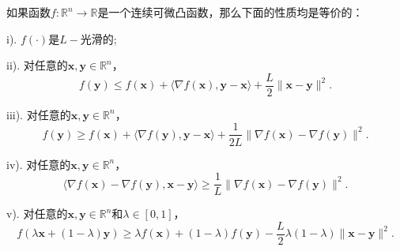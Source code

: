 \begin{theorem}[$L-$光滑的多种刻画性质]
    如果函数$f: \mathbb{R}^{n} \rightarrow \mathbb{R}$是一个连续可微凸函数，那么下面的性质均是等价的：
\par     i). $f(\cdot)$是$L -$光滑的; 
\par    ii). 对任意的$\bm{x}, \bm{y} \in \mathbb{R}^{n}$，
    \begin{equation}
        f(\bm{y}) \leq f(\bm{x})+\langle\nabla f(\bm{x}), \bm{y}-\bm{x}\rangle+\frac{L}{2}\|\bm{x}-\bm{y}\|^{2} .
        \nonumber
    \end{equation} 
\par    iii). 对任意的$\bm{x}, \bm{y} \in \mathbb{R}^{n}$，
    \begin{equation}
        f(\bm{y}) \geq f(\bm{x})+\langle\nabla f(\bm{y}), \bm{y}-\bm{x}\rangle+\frac{1}{2 L}\|\nabla f(\bm{x})-\nabla f(\bm{y})\|^{2} .
        \nonumber
    \end{equation}
\par    iv). 对任意的$\bm{x}, \bm{y} \in \mathbb{R}^{n}$，
    \begin{equation}
        \langle\nabla f(\bm{x})-\nabla f(\bm{y}), \bm{x}-\bm{y}\rangle \geq \frac{1}{L}\|\nabla f(\bm{x})-\nabla f(\bm{y})\|^{2} .
        \nonumber
    \end{equation}
\par     v). 对任意的$\bm{x}, \bm{y} \in \mathbb{R}^{n}$和$\lambda \in[0,1]$，
    \begin{equation}
        f(\lambda \bm{x}+(1-\lambda) \bm{y}) \geq \lambda f(\bm{x})+(1-\lambda) f(\bm{y})-\frac{L}{2} \lambda(1-\lambda)\|\bm{x}-\bm{y}\|^{2} .
        \nonumber
    \end{equation}
    \label{thm1_1}
\end{theorem}
